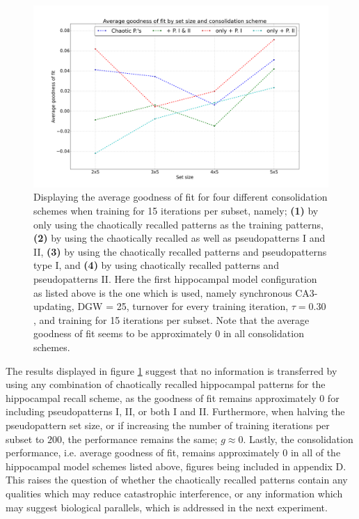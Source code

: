 \begin{figure}
    \centering
    \includegraphics[width=14cm]{fig/neo-consolidation/consolidation-schemes-sync-tm1-tr30_15_iters}
    \caption{Displaying the average goodness of fit for four different consolidation schemes when training for 15 iterations per subset, namely; \textbf{(1)} by only using the chaotically recalled patterns as the training patterns, \textbf{(2)} by using the chaotically recalled as well as pseudopatterns I and II, \textbf{(3)} by using the chaotically recalled patterns and pseudopatterns type I, and \textbf{(4)} by using chaotically recalled patterns and pseudopatterns II. Here the first hippocampal model configuration as listed above is the one which is used, namely synchronous CA3-updating, DGW = 25, turnover for every training iteration, $\tau=0.30$, and training for 15 iterations per subset. Note that the average goodness of fit seems to be approximately 0 in all consolidation schemes.}
    \label{fig:consolidation-schemes-sync}
\end{figure}

The results displayed in figure \ref{fig:consolidation-schemes-sync} suggest that no information is transferred by using any combination of chaotically recalled hippocampal patterns for the hippocampal recall scheme, as the goodness of fit remains approximately 0 for including pseudopatterns I, II, or both I and II. Furthermore, when halving the pseudopattern set size, or if increasing the number of training iterations per subset to $200$, the performance remains the same; $g\approx 0$. Lastly, the consolidation performance, i.e. average goodness of fit, remains approximately $0$ in all of the hippocampal model schemes listed above, figures being included in appendix D. 
This raises the question of whether the chaotically recalled patterns contain any qualities which may reduce catastrophic interference, or any information which may suggest biological parallels, which is addressed in the next experiment.

